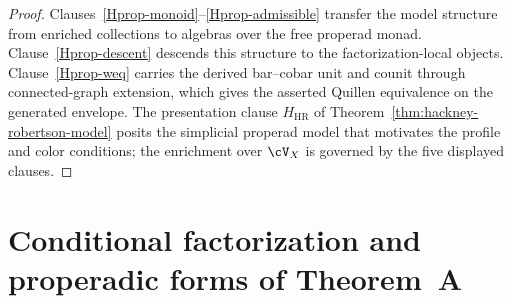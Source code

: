 \begin{proof}
Clauses~\ref{Hprop-monoid}--\ref{Hprop-admissible} transfer the model
structure from enriched collections to algebras over the free
properad monad.  Clause~\ref{Hprop-descent} descends this structure to
the factorization-local objects.  Clause~\ref{Hprop-weq} carries the
derived bar--cobar unit and counit through connected-graph extension,
which gives the asserted Quillen equivalence on the generated
envelope.  The presentation clause $H_{\mathrm{HR}}$ of
Theorem~\ref{thm:hackney-robertson-model} posits the
simplicial properad model that motivates the profile and color
conditions; the enrichment over $\cV_X$ is governed by the five
displayed clauses.
\end{proof}

\section{Conditional factorization and properadic forms of Theorem~A}
\label{sec:ainf2-main}

